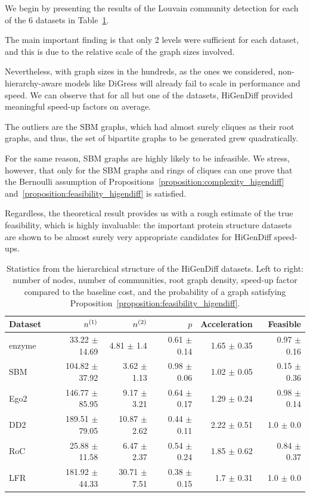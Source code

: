 We begin by presenting the results of the Louvain community detection for each of the 6 datasets in Table~\ref{tab:higendiff_datasets}. 

The main important finding is that only 2 levels were sufficient for each dataset, and this is due to the relative scale of the graph sizes involved. 

Nevertheless, with graph sizes in the hundreds, as the ones we considered, non-hierarchy-aware models like DiGress will already fail to scale in performance and speed. We can observe that for all but one of the datasets, HiGenDiff provided meaningful speed-up factors on average. 

The outliers are the SBM graphs, which had almost surely cliques as their root graphs, and thus, the set of bipartite graphs to be generated grew quadratically.

For the same reason, SBM graphs are highly likely to be infeasible. We stress, however, that only for the SBM graphs and rings of cliques can one prove that the Bernoulli assumption of Propositions~\ref{proposition:complexity_higendiff} and~\ref{proposition:feasibility_higendiff} is satisfied. 

Regardless, the theoretical result provides us with a rough estimate of the true feasibility, which is highly invaluable: the important protein structure datasets are shown to be almost surely very appropriate candidates for HiGenDiff speed-ups.

\begin{table}[H]
    \centering
    \caption[Statistics from the hierarchical structure of the HiGenDiff datasets.]{Statistics from the hierarchical structure of the HiGenDiff datasets. Left to right: number of nodes, number of communities, root graph density, speed-up factor compared to the baseline cost, and the probability of a graph satisfying Proposition~\ref{proposition:feasibility_higendiff}.}
    \label{tab:higendiff_datasets}
\begin{tabular}{lrrrrr}
\toprule
Dataset & $n^{\mathopen{}\left(1\right)}$ & $n^{\mathopen{}\left(2\right)}$ & $p$ & Acceleration & Feasible \\
\midrule
enzyme & 33.22 $\pm$ 14.69 & 4.81 $\pm$ 1.4 & 0.61 $\pm$ 0.14 & 1.65 $\pm$ 0.35 & 0.97 $\pm$ 0.16 \\
SBM & 104.82 $\pm$ 37.92 & 3.62 $\pm$ 1.13 & 0.98 $\pm$ 0.06 & 1.02 $\pm$ 0.05 & 0.15 $\pm$ 0.36 \\
Ego2 & 146.77 $\pm$ 85.95 & 9.17 $\pm$ 3.21 & 0.64 $\pm$ 0.17 & 1.29 $\pm$ 0.24 & 0.98 $\pm$ 0.14 \\
DD2 & 189.51 $\pm$ 79.05 & 10.87 $\pm$ 2.62 & 0.44 $\pm$ 0.11 & 2.22 $\pm$ 0.51 & 1.0 $\pm$ 0.0 \\
RoC & 25.88 $\pm$ 11.58 & 6.47 $\pm$ 2.37 & 0.54 $\pm$ 0.24 & 1.85 $\pm$ 0.62 & 0.84 $\pm$ 0.37 \\
LFR & 181.92 $\pm$ 44.33 & 30.71 $\pm$ 7.51 & 0.38 $\pm$ 0.15 & 1.7 $\pm$ 0.31 & 1.0 $\pm$ 0.0 \\
\bottomrule
\end{tabular}
\end{table}

